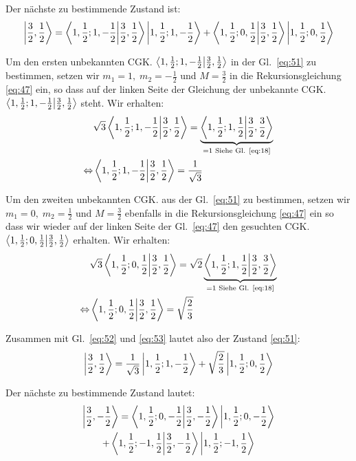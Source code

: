 Der nächste zu bestimmende Zustand ist:
\begin{equation}
  \label{eq:51}
  \ket{\frac 3 2, \frac 1 2}=
  \braket{1, \frac 1 2; 1, -\frac 1 2}{\frac 3 2, \frac 1 2}
  \ket{1, \frac 1 2; 1, -\frac 1 2}
  +\braket{1, \frac 1 2; 0, \frac 1 2}{\frac 3 2, \frac 1 2}
  \ket{1, \frac 1 2; 0, \frac 1 2}
\end{equation}

Um den ersten unbekannten CGK. \(\braket{1, \frac 1 2; 1, -\frac 1 2}{\frac 3 2,
  \frac 1 2}\) in der Gl.~\eqref{eq:51} zu bestimmen, setzen wir \(m_1=1,
\;m_2=-\frac 1 2\) und \( M=\frac 3 2\) in die Rekursionsgleichung \eqref{eq:47}
ein, so dass auf der linken Seite der Gleichung der unbekannte CGK. \(\braket{1,
\frac 1 2; 1, -\frac 1 2}{\frac 3 2, \frac 1 2}\) steht. Wir erhalten:
\begin{align}
  \label{eq:52}
  &\sqrt 3 \braket{1, \frac 1 2; 1, -\frac 1 2}{\frac 3 2,\frac 1 2}
  = \underbrace{
    \braket{1, \frac 1 2; 1, \frac 1 2}{\frac 3 2,\frac 3 2}}
  _{=1 \text{ Siehe Gl. \eqref{eq:18}}}\notag\\
 \Leftrightarrow &\braket{1, \frac 1 2; 1, -\frac 1 2}{\frac 3 2,\frac 1 2}
 = \frac 1 {\sqrt 3} 
\end{align}

Um den zweiten unbekannten CGK. aus der Gl.~\eqref{eq:51} zu bestimmen, setzen
wir \(m_1=0, \;m_2=\frac 1 2\) und \( M=\frac 3 2\) ebenfalls in die
Rekursionsgleichung \eqref{eq:47} ein so dass wir wieder auf der linken Seite
der Gl.~\eqref{eq:47} den gesuchten CGK. \(\braket{1, \frac 1 2; 0, \frac 1
2}{\frac 3 2,\frac 1 2}\) erhalten. Wir erhalten:
\begin{align}
  \label{eq:53}
  &\sqrt 3 \braket{1, \frac 1 2; 0, \frac 1 2}{\frac 3 2,\frac 1 2}
  = \sqrt 2 \underbrace{
    \braket{1, \frac 1 2; 1, \frac 1 2}{\frac 3 2,\frac 3 2}}
  _{=1 \text{ Siehe Gl. \eqref{eq:18}}}\notag\\
 \Leftrightarrow &\braket{1, \frac 1 2; 0, \frac 1 2}{\frac 3 2,\frac 1 2}
 = \sqrt {\frac 2  3} 
\end{align}

Zusammen mit Gl.~\eqref{eq:52} und \eqref{eq:53} lautet also der Zustand
\eqref{eq:51}:
\begin{equation}
  \label{eq:54}
  \left| \frac 3 2, \frac 1 2 \right\rangle=
  \frac 1 {\sqrt 3}
  \left| 1, \frac 1 2; 1, -\frac 1 2 \right\rangle
  +\sqrt {\frac 2 3} 
  \left| 1, \frac 1 2; 0, \frac 1 2 \right\rangle
\end{equation}

Der nächste zu bestimmende Zustand lautet:
\begin{multline}
  \label{eq:55}
    \ket{\frac 3 2, -\frac 1 2}=
  \braket{1, \frac 1 2; 0, -\frac 1 2}{\frac 3 2, -\frac 1 2}
  \ket{1, \frac 1 2; 0, -\frac 1 2}\\
  +\braket{1, \frac 1 2; -1, \frac 1 2}{\frac 3 2, -\frac 1 2}
  \ket{1, \frac 1 2; -1, \frac 1 2}
\end{multline}

